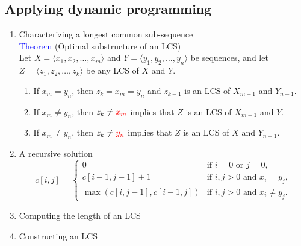 \documentclass[a4paper]{article}
\begin{document}
\subsection*{Applying dynamic programming}
    \begin{enumerate}
        \item Characterizing a longest common sub-sequence\\
            \textcolor{blue}{Theorem} (Optimal substructure of an LCS)\\
            Let $X=\langle x_1,x_2,\ldots, x_m\rangle$ and $Y=\langle y_1,y_2,\ldots, y_n\rangle$ be sequences, and let $Z=\langle z_1,z_2,\ldots, z_k\rangle$ be any LCS of $X$ and $Y$.
            \begin{enumerate}
                \item If $x_m=y_n$, then $z_k=x_m=y_n$ and $z_{k-1}$ is an LCS of $X_{m-1}$ and $Y_{n-1}$.
                \item If $x_m\neq y_n$, then $z_k\neq \textcolor{red}{x_m}$ implies that $Z$ is an LCS of $X_{m-1}$ and $Y$.
                \item If $x_m\neq y_n$, then $z_k\neq \textcolor{red}{y_n}$ implies that $Z$ is an LCS of $X$ and $Y_{n-1}$.
            \end{enumerate}
        \item A recursive solution
            \begin{equation*}
                c[i,j] =
                \begin{cases}
                0  & \text{if $i=0$ or $j=0$,} \\
                c[i-1,j-1]+1 & \text{if $i,j>0$ and $x_i=y_j$},\\
                \max{(c[i,j-1],c[i-1,j])} & \text{if $i,j>0$ and $x_i\neq y_j$}.
                \end{cases}    
            \end{equation*}
        \item Computing the length of an LCS
        \item Constructing an LCS
    \end{enumerate}
\end{document}
